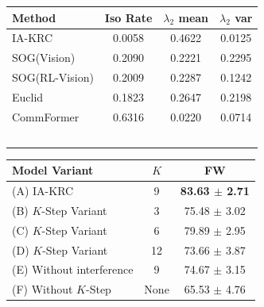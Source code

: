\documentclass[10pt]{article} %
\begin{document}
\begin{figure}[!htbp]
\centering
\begin{minipage}[t]{0.48\textwidth}
    \centering
    \vspace{0pt}
    \small
    \setlength{\tabcolsep}{3pt}
    \begin{tabular}{lccc}
    \toprule
    \textbf{Method} & \textbf{Iso Rate} & \textbf{$\lambda_{2}$ mean} & \textbf{$\lambda_{2}$ var} \\
    \midrule
     IA-KRC     & 0.0058 & 0.4622 & 0.0125 \\
     SOG(Vision)     & 0.2090 & 0.2221 & 0.2295 \\
     SOG(RL-Vision)  & 0.2009 & 0.2287 & 0.1242 \\
     Euclid     & 0.1823 & 0.2647 & 0.2198 \\
     CommFormer & 0.6316 & 0.0220 & 0.0714 \\
     \textcolor{white}{.} & \textcolor{white}{.} & \textcolor{white}{.} & \textcolor{white}{.} \\
    \bottomrule
    \end{tabular}
    \label{tab:group_metrics}
\end{minipage}
\hfill
\begin{minipage}[t]{0.48\textwidth}
    \centering
    \vspace{0pt}
    \small
    \begin{tabular}{lcc}
    \toprule
    \textbf{Model Variant} & \textbf{$K$} & \textbf{FW} \\
    \midrule
     (A) IA-KRC & 9 & \textbf{83.63 $\pm$ 2.71} \\
     (B) $K$-Step Variant & 3 & 75.48 $\pm$ 3.02 \\
     (C) $K$-Step Variant & 6 & 79.89 $\pm$ 2.95 \\
     (D) $K$-Step Variant & 12 & 73.66 $\pm$ 3.87 \\
     (E) Without interference & 9 & 74.67 $\pm$ 3.15 \\
     (F) Without $K$-Step & None & 65.53 $\pm$ 4.76 \\
    \bottomrule
    \end{tabular}
    \label{tab:ablation}
\end{minipage}
\end{figure}
\end{document}
